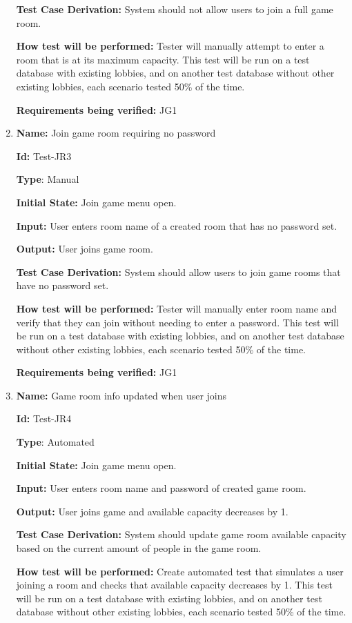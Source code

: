 \documentclass[12pt, titlepage]{article}
\begin{document}
\begin{enumerate}
\textbf{Test Case Derivation:} System should not allow users to join a full game room.

\textbf{How test will be performed:} Tester will manually attempt to enter a room that is at its maximum capacity. This test will be run on a test database with existing lobbies, and on another test database without other existing lobbies, each scenario tested 50\% of the time.

\textbf{Requirements being verified: }JG1

\item{\textbf{Name:} Join game room requiring no password} \label{itm:Test-JR2}

\textbf{Id:} Test-JR3

\textbf{Type}: Manual

\textbf{Initial State:} Join game menu open.

\textbf{Input:} User enters room name of a created room that has no password set.

\textbf{Output:} User joins game room.

\textbf{Test Case Derivation:} System should allow users to join game rooms that have no password set.

\textbf{How test will be performed:} Tester will manually enter room name and verify that they can join without needing to enter a password. This test will be run on a test database with existing lobbies, and on another test database without other existing lobbies, each scenario tested 50\% of the time.

\textbf{Requirements being verified: }JG1

\item{\textbf{Name:} Game room info updated when user joins} \label{itm:Test-JR3}

\textbf{Id:} Test-JR4

\textbf{Type}: Automated

\textbf{Initial State:} Join game menu open. 

\textbf{Input:} User enters room name and password of created game room.

\textbf{Output:} User joins game and available capacity decreases by 1.

\textbf{Test Case Derivation:} System should update game room available capacity based on the current amount of people in the game room.

\textbf{How test will be performed:} Create automated test that simulates a user joining a room and checks that available capacity decreases by 1. This test will be run on a test database with existing lobbies, and on another test database without other existing lobbies, each scenario tested 50\% of the time.


\end{enumerate}
\end{document}
